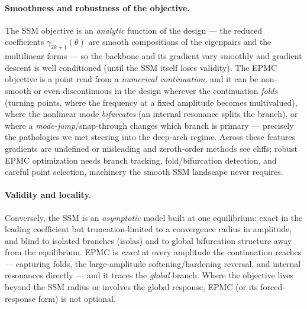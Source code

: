\documentclass[11pt]{article}
\begin{document}
\paragraph{Smoothness and robustness of the objective.}
The SSM objective is an \emph{analytic} function of the design --- the reduced
coefficients $\gamma_{2k+1}(\theta)$ are smooth compositions of the eigenpairs and
the multilinear forms --- so the backbone and its gradient vary smoothly and
gradient descent is well conditioned (until the SSM itself loses validity). The EPMC
objective is a point read from a \emph{numerical continuation}, and it can be
non-smooth or even discontinuous in the design wherever the continuation \emph{folds}
(turning points, where the frequency at a fixed amplitude becomes multivalued), where
the nonlinear mode \emph{bifurcates} (an internal resonance splits the branch), or
where a \emph{mode-jump}/snap-through changes which branch is primary --- precisely
the pathologies we met steering into the deep-arch regime. Across these features
gradients are undefined or misleading and zeroth-order methods see cliffs; robust
EPMC optimization needs branch tracking, fold/bifurcation detection, and careful
point selection, machinery the smooth SSM landscape never requires.

\paragraph{Validity and locality.}
Conversely, the SSM is an \emph{asymptotic} model built at one equilibrium: exact in
the leading coefficient but truncation-limited to a convergence radius in amplitude,
and blind to isolated branches (isolas) and to global bifurcation structure away from
the equilibrium. EPMC is \emph{exact} at every amplitude the continuation reaches ---
capturing folds, the large-amplitude softening/hardening reversal, and internal
resonances directly --- and it traces the \emph{global} branch. Where the objective
lives beyond the SSM radius or involves the global response, EPMC (or its
forced-response form) is not optional.
\end{document}
